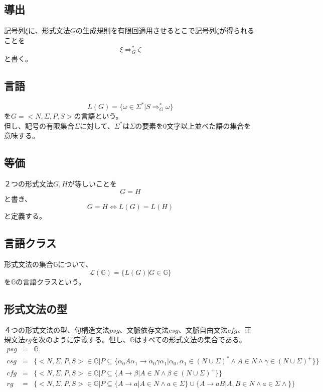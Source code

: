 \documentclass[a4paper]{jarticle}
\begin{document}
\subsection{導出}
記号列$ \xi $に、形式文法$ G $の生成規則を有限回適用させるとこで記号列$ \zeta $が得られることを
\begin{equation}
\xi \Rightarrow _G ^* \zeta
\end{equation}
と書く。
\subsection{言語}
\begin{equation}
L \left( G \right) = \bigl\{ \omega \in \Sigma ^* | S \Rightarrow _G ^* \omega \bigr\}
\end{equation}
を$ G = < N , \Sigma , P , S > $の言語という。\\
但し、記号の有限集合$ \Sigma $に対して、$ \Sigma ^* $は$ \Sigma $の要素を0文字以上並べた語の集合を意味する。
\subsection{等価}
２つの形式文法$ G , H $が等しいことを
\begin{equation}
G = H
\end{equation}
と書き、
\begin{equation}
G = H \iff L \left( G \right) = L \left( H \right)
\end{equation}
と定義する。
\subsection{言語クラス}
形式文法の集合$ \mathbb{G} $について、
\begin{equation}
\mathcal{L} \left( \mathbb{G} \right) = \bigl\{ L \left( G \right) | G \in \mathbb{G} \bigr\}
\end{equation}
を$ \mathbb{G} $の言語クラスという。
\subsection{形式文法の型}
４つの形式文法の型、句構造文法$psg$、文脈依存文法$csg$、文脈自由文法$cfg$、正規文法$rg$を次のように定義する。但し、$ \mathbb{G} $はすべての形式文法の集合である。
\begin{eqnarray}
psg & = & \mathbb{G} \\
csg & = & \bigl\{ < N , \Sigma , P , S > \in \mathbb{G} | P \subseteq \bigl\{ \alpha _0 A \alpha _1 \to \alpha _0 \gamma \alpha _1 | \alpha _0 , \alpha _1 \in \left( N \cup \Sigma \right) ^* \land A \in N \land \gamma \in \left( N \cup \Sigma \right) ^+ \bigr\} \bigr\} \\
cfg & = & \bigl\{ < N , \Sigma , P , S > \in \mathbb{G} | P \subseteq \bigl\{ A \to \beta | A \in N \land \beta \in \left( N \cup \Sigma \right) ^+ \bigr\} \bigr\} \\
rg & = & \bigl\{ < N , \Sigma , P , S > \in \mathbb{G} | P \subseteq \bigl\{ A \to a | A \in N \land a \in \Sigma \bigr\} \cup \bigl\{ A \to aB | A , B \in N \land a \in \Sigma \land \bigr\} \bigr\}
\end{eqnarray}
\end{document}
